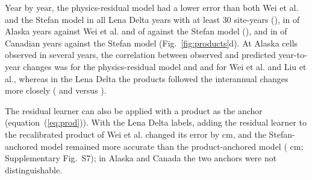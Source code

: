 
Year by year, the physics-residual model had a lower error than both Wei et al. and the Stefan model in all \nywLen{} Lena Delta years with at least 30 site-years (\nyrsywLe), in \nywAkRoWeiwin{} of \nywAkRoWein{} Alaska years against Wei et al. and \nywAkRoPowin{} of \nywAkRoPon{} against the Stefan model (\nyrsywAk), and in \nywCaRoPowin{} of \nywCaRoPon{} Canadian years against the Stefan model (Fig.~\ref{fig:products}d). At Alaska cells observed in several years, the correlation between observed and predicted year-to-year changes was \nrdeltaAkRo{} for the physics-residual model and \nrdeltaAkWei{} and \nrdeltaAkLiu{} for Wei et al. and Liu et al., whereas in the Lena Delta the products followed the interannual changes more closely (\nrdeltaLeWei{} and \nrdeltaLeLiu{} versus \nrdeltaLeRo).

The residual learner can also be applied with a product as the anchor (equation~(\ref{eq:prod})). With the Lena Delta labels, adding the residual learner to the recalibrated product of Wei et al. changed its error by \npadLeRpPcal{} cm, and the Stefan-anchored model remained more accurate than the product-anchored model (\npadLeRoRp{} cm; Supplementary Fig.~S7); in Alaska and Canada the two anchors were not distinguishable.

